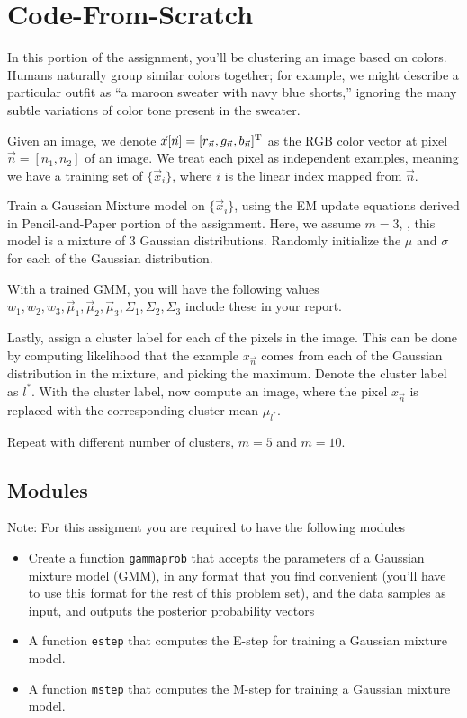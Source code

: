 \documentclass[12pt]{article}
\newcommand{\1}{\mathbf{1}}
\begin{document}
{\section{Code-From-Scratch}
In this portion of the assignment, you'll be clustering an image based on colors. Humans naturally group similar colors together; for example, we might describe a particular outfit as ``a maroon sweater with navy blue shorts,'' ignoring the many subtle variations of color tone present in the sweater.

Given an image, we denote $\vec{x}[\vec{n}] = [r_{\vec{n}}, g_{\vec{n}}, b_{\vec{n}}]^{\rm T}$ as the RGB color vector at pixel $\vec{n} = [n_1, n_2]$ of an image. We treat each pixel as independent examples, meaning we have a training set of $\{\vec{x}_i\}$, where $i$ is the linear index mapped from $\vec{n}$.

Train a Gaussian Mixture model on $\{\vec{x}_i\}$, using the EM update equations derived in Pencil-and-Paper portion of the assignment. Here, we assume $m=3$, , this model is a mixture of 3 Gaussian distributions. Randomly initialize the $\mu$ and $\sigma$ for each of the Gaussian distribution.

With a trained GMM, you will have the following values $w_1, w_2, w_3, \vec{\mu}_1, \vec{\mu}_2, \vec{\mu}_3, \Sigma_1, \Sigma_2, \Sigma_3$ include these in your report.

Lastly, assign a cluster label for each of the pixels in the image. This can be done by computing likelihood that the example $x_{\vec{n}}$ comes from each of the Gaussian distribution in the mixture, and picking the maximum. Denote the cluster label as $l^*$. With the cluster label, now compute an image, where the pixel $x_{\vec{n}}$ is replaced with the corresponding cluster mean $\mu_{l^*}$.

Repeat with different number of clusters, $m=5$ and $m=10$.

\subsection{Modules}
Note: For this assigment you are required to have the following modules
\begin{itemize}
  \item Create a function {\tt gammaprob} that accepts the parameters of a Gaussian mixture model (GMM), in any format that you find convenient (you'll have to use this format for the rest of this problem set), and the data samples as input, and outputs the posterior probability vectors
  \item A function {\tt estep} that computes the E-step for training a Gaussian mixture model.
  \item A function {\tt mstep} that computes the M-step for training a Gaussian mixture model.
\end{itemize}

}
\end{document}
